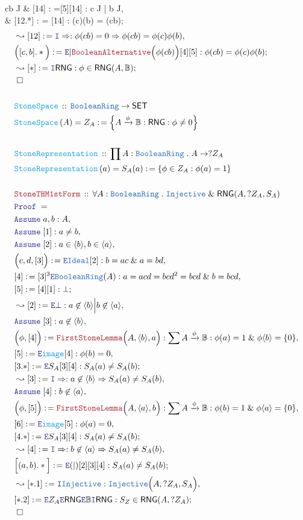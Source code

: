 \documentclass[12pt]{scrartcl}
\newcommand{\TYPE}[1]{\textcolor{NavyBlue}{\mathtt{#1}}}
\newcommand{\FUNC}[1]{\textcolor{Cerulean}{\mathtt{#1}}}
\newcommand{\LOGIC}[1]{\textcolor{Blue}{\mathtt{#1}}}
\newcommand{\THM}[1]{\textcolor{Maroon}{\mathtt{#1}}}
\renewcommand{\.}{\; . \;}
\newcommand{\de}{: \kern 0.1pc =}
\newcommand{\Act}[1]{\left( #1 \right)}
\newcommand{\Theorem}[2]{& \THM{#1} \, :: \, #2 \\ & \Proof = \\ }
\newcommand{\DeclareFunc}[2]{& \FUNC{#1} \, :: \, #2 \\}
\newcommand{\DefineNamedFunc}[4]{&  \FUNC{#1}\Act{#2} = #3 \de #4 \\}
\newcommand{\Page}[1]{ \begin{align*} #1 \end{align*}   }
\renewcommand{\And}{\; \& \;}
\newcommand{\Imply}{\Rightarrow}
\newcommand{\Intro}{\LOGIC{I}}
\newcommand{\Elim}{\LOGIC{E}}
\newcommand{\Arrow}{\xrightarrow}
\newcommand{\Say}[3]{& #1 \de #2 : #3, \\}
\newcommand{\Conclude}[3]{& #1 \de #2 : #3; \\}
\newcommand{\Derive}[3]{& \leadsto #1 \de #2 : #3, \\}
\newcommand{\DeriveConclude}[3]{& \leadsto #1 \de #2 : #3 ; \\}
\newcommand{\Assume}[2]{& \LOGIC{Assume} \; #1 : #2, \\}
\newcommand{\QED}{\; \square}
\newcommand{\EndProof}{& \QED \\}
\newcommand{\Proof}{\LOGIC{Proof} \; }
\newcommand{\Ideal}{\TYPE{Ideal}}
\newcommand{\SET}{\mathsf{SET}}
\newcommand{\RNG}{\mathsf{RNG}}
\newcommand{\Bool}{\mathbb{B}}
\newcommand{\BR}{\TYPE{BooleanRing}}
\begin{document}
{{		cb  \in J
	}
	\Say{[14]}{[5][14]}{c \in J | b \in J}
	\Conclude{[12.*]}{ [14]\Elim \phi \Elim \Bool}{\phi(c)\phi(b) = \phi(cb)}
}\Page{
	\Derive{[12]}{\Intro \Imply}
	{
		\phi(cb)=0 \Imply \phi(cb) = \phi(c)\phi(b)
	}
	\Conclude{\Big([c,b].*\Big)}{\Elim | \THM{BooleanAlternative}\Big( \phi(cb) \Big)[4][5]} 
	{
		\phi(cb) = \phi(c)\phi(b)
	}
	\DeriveConclude{[*]}{\Intro \RNG}
	{
		\phi \in \RNG(A,\Bool)
	}
	\EndProof
	\\
	\DeclareFunc{StoneSpace}{ \BR \to \SET}
	\DefineNamedFunc{StoneSpace}{A}{Z_A}{\Big\{ A \Arrow{\phi} \Bool : \RNG  : \phi \neq 0 \Big\}}
	\\
	\DeclareFunc{StoneRepresentation}{\prod A : \BR \. A  \to ?Z_A}
	\DefineNamedFunc{StoneRepresentation}{a}{S_A(a)}
	{
		\{ \phi \in Z_A :  \phi(a) = 1 \}
	}
	\\
	\Theorem{StoneTHM1stForm}
	{
		\forall A : \BR \.
		\TYPE{Injective} \And \RNG(A,?Z_A,S_A)
	}
	\Assume{a,b}{A}
	\Assume{[1]}{a \neq b}
	\Assume{[2]}{a \in \langle b \rangle, b \in \langle a \rangle}
	\Say{\Big( c,d,[3]\Big)}{\Elim \Ideal [2]}
	{
		b = ac \And a = bd 
	}
	\Say{[4]}{[3]^3\Elim \BR(A)}
	{
		a = acd = bcd^2 = bcd \And b = bcd 
	}
	\Conclude{[5]}{[4][1]}{\bot}
	\Derive{[2]}{\Elim \bot}
	{
	 	a \not \in \langle b \rangle 
		 \Big|
		b \not \in \langle a \rangle
	}
	\Assume{[3]}{a \not \in \langle b \rangle}
	\Say{\Big(\phi,[4]\Big)}{\THM{FirstStoneLemma}\Big(A,\langle b\rangle, a \Big)}
	{
		\sum A \Arrow{\phi} \Bool : \phi(a) = 1 \And \phi\langle b \rangle = \{0\}
	}
	\Say{[5]}{\Elim \FUNC{image}[4]}{\phi(b) = 0}
	\Conclude{[3.*]}{\Elim S_A [3][4]}
	{
		S_A(a) \neq S_A(b)
	}
	\Derive{[3]}{\Intro \Imply}{a \not \in \langle b \rangle \Imply S_A(a) \neq S_A(b)}
	\Assume{[4]}{b \not \in \langle a \rangle}
	\Say{\Big(\phi,[5]\Big)}{\THM{FirstStoneLemma}\Big(A,\langle a\rangle, b \Big)}
	{
		\sum A \Arrow{\phi} \Bool : \phi(b) = 1 \And \phi\langle a \rangle = \{0\}
	}
	\Say{[6]}{\Elim \FUNC{image}[5]}{\phi(a) = 0}
	\Conclude{[4.*]}{\Elim S_A [3][4]}
	{
		S_A(a) \neq S_A(b)
	}
	\Derive{[4]}{\Intro \Imply}{b \not \in \langle a \rangle \Imply S_A(a) \neq S_A(b)}
	\Conclude{\Big[(a,b).*\Big]}{\Elim(|)[2][3][4]}{S_A(a) \neq S_A(b)}
	\Derive{[*.1]}{\Intro \TYPE{Injective}}{\TYPE{Injective}\Big(A,?Z_A, S_A\Big)}
	\Conclude{[*.2]}{\Elim Z_A \Elim \RNG \Elim \Bool \Intro \RNG}
	{
		S_Z \in \RNG(A,?Z_A)
	}
	\EndProof
}
\newpage
\end{document}
